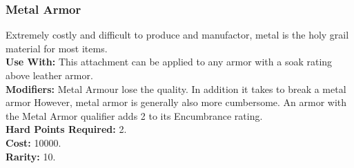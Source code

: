 \subsubsection{Metal Armor}
Extremely costly and difficult to produce and manufactor, metal is the holy grail
material for most items.\\
\textbf{Use With:} This attachment can be applied to any armor with a soak rating above leather armor.\\
\textbf{Modifiers:} Metal Armour lose the  quality.
    In addition it takes \despair\despair to break a metal armor
    However, metal armor is generally also more cumbersome. An armor with the Metal
    Armor qualifier adds 2 to its Encumbrance rating.\\
\textbf{Hard Points Required:} 2.\\
\textbf{Cost:} 10000.\\
\textbf{Rarity:} 10.\\
